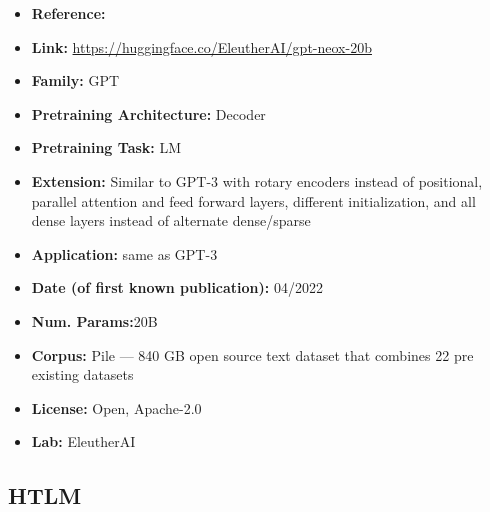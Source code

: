 \documentclass{article}
\begin{document}
            \begin{itemize}
                \item \textbf{Reference:} \href{https://arxiv.org/abs/2204.06745}{}
                \item \textbf{Link:} \url{https://huggingface.co/EleutherAI/gpt-neox-20b}
                \item \textbf{Family:} GPT 
                \item \textbf{Pretraining Architecture:} Decoder
                \item \textbf{Pretraining Task:} LM
                \item \textbf{Extension:} Similar to GPT-3 with rotary encoders instead of positional, parallel attention and feed forward layers, different initialization, and all dense layers instead of alternate dense/sparse  
                \item \textbf{Application:} same as GPT-3
                \item \textbf{Date (of first known publication):} 04/2022
                \item \textbf{Num. Params:}20B
                \item \textbf{Corpus:} Pile — 840 GB open source text dataset that combines 22 pre existing datasets
                \item \textbf{License:} Open, Apache-2.0
                \item \textbf{Lab:} EleutherAI
            \end{itemize}




\subsection{HTLM}
\end{document}
